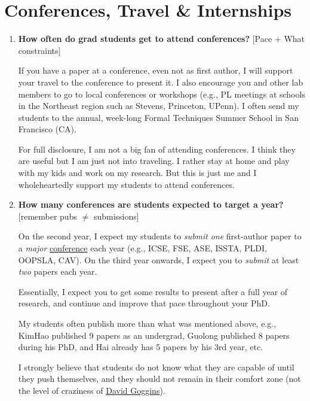 \documentclass{article}
\begin{document}
\section{Conferences, Travel \& Internships}

\begin{enumerate}[label=\arabic*.]
    \item \textbf{How often do grad students get to attend conferences?} [Pace + What constraints]  
    
    If you have a paper at a conference, even not as first author, I will support your travel to the conference to present it. I also encourage you and other lab members to go to local conferences or workshops (e.g., PL meetings at schools in the Northeast region such as Stevens, Princeton, UPenn). I often send my students to the annual, week-long Formal Techniques Summer School in San Francisco (CA).
    
    For full disclosure, I am not a big fan of attending conferences. I think they are useful but I am just not into traveling. I rather stay at home and play with my kids and work on my research. But this is just me and I wholeheartedly support my students to attend conferences. %

    \item \textbf{How many conferences are students expected to target a year?} [remember pubs $\neq$ submissions]  
    
    On the second year, I expect my students to \textit{submit} \textit{one} first-author paper to a \textit{major} \href{https://roars.dev/csconfs}{conference} each year (e.g., ICSE, FSE, ASE, ISSTA, PLDI, OOPSLA, CAV). 
    On the third year onwards, I expect you to \textit{submit} at least \textit{two} papers each year.

    Essentially, I expect you to get some results to present after a full year of research, and continue and improve that pace throughout your PhD.

    My students often publish more than what was mentioned above, e.g., KimHao published 9 papers as an undergrad, Guolong published 8 papers during his PhD, and Hai already has 5 papers by his 3rd year, etc. 
    
    I strongly believe that students do not know what they are capable of until they push themselves, and they should not remain in their comfort zone (not the level of craziness of \href{https://davidgoggins.com/}{David Goggins}).


\end{enumerate}
\end{document}
